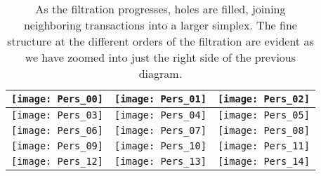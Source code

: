 \begin{center}
\begin{table}
\begin{tabular}{|c|c|c|}
\hline
 \texttt{[image: Pers\_00]} & \texttt{[image: Pers\_01]} & \texttt{[image: Pers\_02]} \\ \hline
  \texttt{[image: Pers\_03]} & \texttt{[image: Pers\_04]} & \texttt{[image: Pers\_05]} \\ \hline
 \texttt{[image: Pers\_06]} & \texttt{[image: Pers\_07]} & \texttt{[image: Pers\_08]} \\ \hline
 \texttt{[image: Pers\_09]} & \texttt{[image: Pers\_10]} & \texttt{[image: Pers\_11]} \\ \hline
  \texttt{[image: Pers\_12]} & \texttt{[image: Pers\_13]} & \texttt{[image: Pers\_14]} \\ \hline
\end{tabular}
\caption{
As the filtration progresses, holes are filled, joining neighboring transactions into a larger simplex.  The fine structure at the different orders of the filtration are evident as we have zoomed into just the right side of the previous diagram.}
\label{tab:pers}
\end{table}
\end{center}


